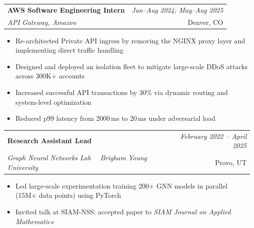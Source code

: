 \documentclass[letterpaper,11pt]{article}
\makeatletter
\newcommand{\entry}[4]{%
  \noindent\begin{tabularx}{\textwidth}{@{}X r@{}}
    \textbf{#1} & \textit{#2} \\
    \textit{#3} & #4 \\
  \end{tabularx}\vspace{2pt}
}
\makeatother
\begin{document}
\entry{AWS Software Engineering Intern}{Jun--Aug 2024; May--Aug 2025}
      {API Gateway, Amazon}{Denver, CO}
\vspace{-4pt}
\begin{itemize}
  \item Re-architected Private API ingress by removing the NGINX proxy layer and implementing direct traffic handling
  \item Designed and deployed an isolation fleet to mitigate large-scale DDoS attacks across 300K+ accounts
  \item Increased successful API transactions by 30\% via dynamic routing and system-level optimization
  \item Reduced p99 latency from 2000\,ms to 20\,ms under adversarial load
\end{itemize}

\entry{Research Assistant Lead}{February 2022 -- April 2025}
      {Graph Neural Networks Lab \, \textbullet\, Brigham Young University}{Provo, UT}
\vspace{-4pt}
\begin{itemize}
  \item Led large-scale experimentation training 200+ GNN models in parallel (15M+ data points) using PyTorch
  \item Invited talk at SIAM-NSS; accepted paper to \textit{SIAM Journal on Applied Mathematics}
\end{itemize}
\end{document}

